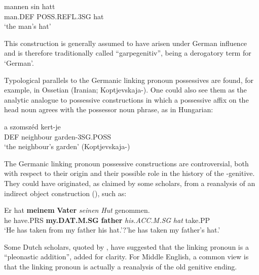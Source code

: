 \ea\label{}
\gll mannen  sin  hatt\\
man.DEF  POSS.REFL.3SG  hat\\
\glt ‘the man’s hat’
\z

This construction is generally assumed to have arisen under German influence and is therefore traditionally called “garpegenitiv”,  being a derogatory term for ‘German’.

Typological parallels to the Germanic linking pronoun possessives are found, for example, in Ossetian (Iranian; Koptjevskaja-\citet[669]{Tamm2003}). One could also see them as the analytic analogue to possessive constructions in which a possessive affix on the head noun agrees with the possessor noun phrase, as in Hungarian:

\ea\label{}
\gll a  szomszéd  kert-je\\
DEF  neighbour  garden-3SG.POSS\\
\glt ‘the neighbour’s garden’ (Koptjevskaja-\citet[648]{Tamm2003}) 
\z

The Germanic linking pronoun possessive constructions are controversial, both with respect to their origin and their possible role in the history of the -genitive. They could have originated, as claimed by some scholars, from a reanalysis of an indirect object construction (\citet[638]{Behaghel1923}), such as:

\ea\label{}
\gll Er  hat  \textbf{meinem} \textbf{Vater} \textit{seinen}\textit{  Hut}\textit{  }genommen.\\
he  have.PRS  \textbf{my.DAT.M.SG} \textbf{father} \textit{his.ACC.M.SG}\textit{  }\textit{hat}\textit{  }take.PP\\
\glt ‘He has taken from my father his hat.’?’he has taken my father’s hat.’
\z

Some Dutch scholars, quoted by \citet[58]{Norde1997}, have suggested that the linking pronoun is a “pleonastic addition”, added for clarity. For Middle English, a common view is that the linking pronoun  is actually a reanalysis of the old genitive ending.

